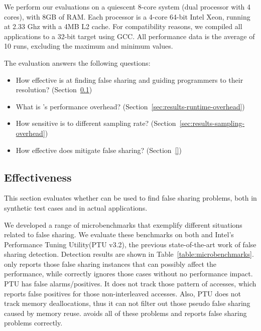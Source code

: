 \label{sec:evaluation}

We perform our evaluations on a quiescent 8-core system (dual
processor with 4 cores), with 8GB of RAM. Each processor is a 4-core 64-bit Intel Xeon, running at 2.33 Ghz with a 4MB L2 cache. For compatibility reasons, we compiled all applications to a 32-bit target using GCC. All performance data is the average of 10 runs, excluding the maximum and minimum values.

The evaluation answers the following questions:

\begin{itemize}
\item How effective is \sheriffdetect{} at finding false sharing and guiding programmers to their resolution? (Section~\ref{sec:effecteval})
\item What is \sheriffdetect{}'s performance overhead? (Section~\ref{sec:results-runtime-overhead})
\item How sensitive is \sheriffdetect{} to different sampling rate? (Section~\ref{sec:results-sampling-overhead}) 
\item How effective does \sheriffprotect{} mitigate false sharing? (Section~\ref{})
\end{itemize}

\subsection{\sheriffdetect{} Effectiveness}

\label{sec:effecteval}

This section evaluates whether \sheriffdetect{} can be used to find false sharing problems, both in synthetic test cases and in actual applications.

We developed a range of microbenchmarks that exemplify different situations related to false sharing. We evaluate these benchmarks on both \SheriffDetect{} and Intel's Performance Tuning Utility(PTU v3.2), the previous state-of-the-art work of false sharing detection.
Detection results are shown in Table~\ref{table:microbenchmarks}. \sheriffdetect{} only reports those false sharing instances that can possibly affect the performance, while correctly ignores those cases without no performance impact.
PTU has false alarms/positives.  It does not track those pattern of accesses, which reports false positives for those non-interleaved accesses. Also, PTU does not track memory deallocations, thus it can not filter out those pseudo false sharing caused by memory reuse. \sheriffdetect{} avoids all of these problems and reports false sharing problems correctly. 


